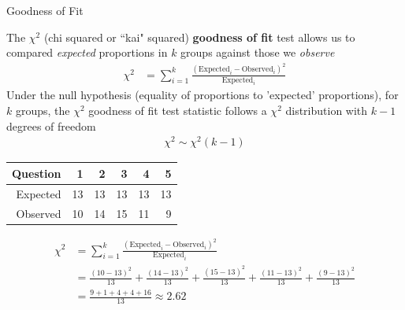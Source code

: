 \documentclass{beamer}
\begin{document}
\begin{frame}{Goodness of Fit}

The $\chi^2$ (chi squared or ``kai" squared) \textbf{goodness of fit} test allows us to compared \textit{expected} proportions in $k$ groups against those we \textit{observe}
\begin{align*}
\chi^2 &= \sum_{i=1}^k \frac{(\text{Expected}_i - \text{Observed}_i)^2}{\text{Expected}_i} 
\end{align*}
Under the null hypothesis (equality of proportions to 'expected' proportions), for $k$ groups, the $\chi^2$ goodness of fit test statistic follows a $\chi^2$ distribution with $k-1$ degrees of freedom
\begin{align*}
\chi^2 \sim \chi^2(k-1)
\end{align*}

\end{frame}

\begin{frame}
\begin{table}[ht]
\centering
\begin{tabular}{rrrrrr}
  \hline
Question & 1 & 2 & 3 & 4 & 5 \\ 
  \hline
Expected & 13 & 13 & 13 & 13 & 13 \\ 
  Observed & 10 & 14 & 15 & 11 & 9 \\  
   \hline
\end{tabular}
\end{table}

\begin{align*}
\chi^2 &= \sum_{i=1}^k \frac{(\text{Expected}_i - \text{Observed}_i)^2}{\text{Expected}_i} \\[1em]
&= \frac{(10-13)^2}{13} + \frac{(14-13)^2}{13} + \frac{(15-13)^2}{13} + \frac{(11-13)^2}{13}+\frac{(9-13)^2}{13} \\[1em]
&= \frac{9 + 1 + 4 + 4 + 16}{13} \approx 2.62
\end{align*}

\end{frame}
\end{document}
